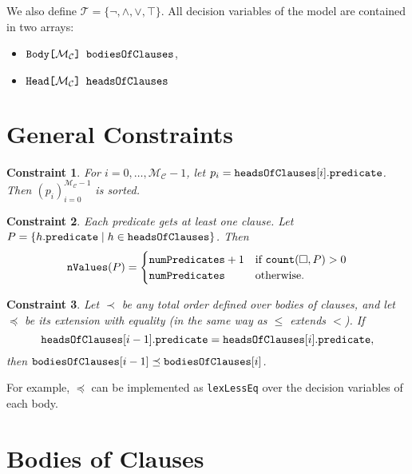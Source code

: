 \documentclass[runningheads]{llncs}
\newtheorem{constraint}{Constraint}
\newcommand{\variable}[1]{\texttt{\textup{#1}}}
\newcommand{\arrayt}[3]{\variable{{#3}[}{#2}\variable{] {#1}}}
\newcommand{\tokens}{\mathcal{T}}
\newcommand{\maxNumClauses}{\mathcal{M}_{\mathcal{C}}}
\begin{document}
We also define $\tokens{} = \{ \neg, \land, \lor, \top \}$. All decision
variables of the model are contained in two arrays:
\begin{itemize}
\item $\arrayt{bodiesOfClauses}{\maxNumClauses{}}{Body}$,
\item $\arrayt{headsOfClauses}{\maxNumClauses{}}{Head}$
\end{itemize}

\section{General Constraints}

\begin{constraint}
  For $i = 0, \dots, \maxNumClauses - 1$, let $p_i =
  \variable{headsOfClauses}[i].\variable{predicate}$. Then
  $(p_i)_{i=0}^{\maxNumClauses - 1}$ is sorted.
\end{constraint}

\begin{constraint}
  Each predicate gets at least one clause. Let $P = \{ h.\variable{predicate}
  \mid h \in \variable{headsOfClauses} \}$. Then
  \[
    \variable{nValues}(P) =
    \begin{cases}
      \variable{numPredicates} + 1 & \text{if } \variable{count}(\Box, P) > 0 \\
      \variable{numPredicates} & \text{otherwise.}
    \end{cases}
  \]
\end{constraint}

\begin{constraint}
  Let $\prec$ be any total order defined over bodies of clauses, and let
  $\preceq$ be its extension with equality (in the same way as $\le$ extends
  $<$). If
  \[
    \variable{headsOfClauses}[i-1].\variable{predicate} =
    \variable{headsOfClauses}[i].\variable{predicate},
  \]
  then $\variable{bodiesOfClauses}[i-1] \preceq \variable{bodiesOfClauses}[i]$.
\end{constraint}
For example, $\preceq$ can be implemented as \variable{lexLessEq} over the
decision variables of each body.

\section{Bodies of Clauses}
\end{document}
